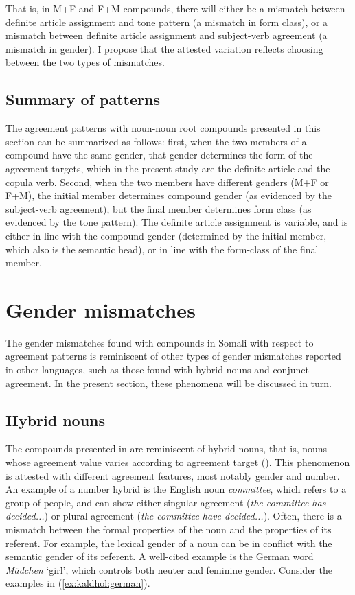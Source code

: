 \documentclass[output=paper]{langscibook}
\begin{document}
That is, in M+F and F+M compounds, there will either be a mismatch between definite article assignment and tone pattern (a mismatch in form class), or a mismatch between definite article assignment and subject-verb agreement (a mismatch in gender). I propose that the attested variation reflects choosing between the two types of mismatches.

\subsection{Summary of patterns}\label{sec:kaldhol:patterns}
The agreement patterns with noun-noun root compounds presented in this section can be summarized as follows: first, when the two members of a compound have the same gender, that gender determines the form of the agreement targets, which in the present study are the definite article and the copula verb. Second, when the two members have different genders (M+F or F+M), the initial member determines compound gender (as evidenced by the subject-verb agreement), but the final member determines form class (as evidenced by the tone pattern). The definite article assignment is variable, and is either in line with the compound gender (determined by the initial member, which also is the semantic head), or in line with the form-class of the final member.

\section{Gender mismatches}\label{sec:kaldhol:mismatches}
The gender mismatches found with compounds in Somali with respect to agreement patterns is reminiscent of other types of gender mismatches reported in other languages, such as those found with hybrid nouns and conjunct agreement. In the present section, these phenomena will be discussed in turn.

\subsection{Hybrid nouns}\label{sec:kaldhol:hybrids}
The compounds presented in  are reminiscent of hybrid nouns, that is, nouns whose agreement value varies according to agreement target (\citealt{Corbett1991,Corbett2006,Enger2012}). This phenomenon is attested with different agreement features, most notably gender and number. An example of a number hybrid is the English noun \textit{committee}, which refers to a group of people, and can show either singular agreement (\textit{the committee has decided...}) or plural agreement (\textit{the committee have decided...}). Often, there is a mismatch between the formal properties of the noun and the properties of its referent. For example, the lexical gender of a noun can be in conflict with the semantic gender of its referent. A well-cited example is the German word \textit{Mädchen} `girl', which controls both neuter and feminine gender. Consider the examples in (\ref{ex:kaldhol:german}).
\end{document}
